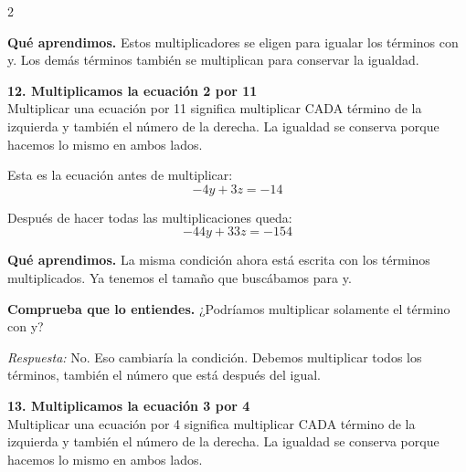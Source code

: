 \documentclass[11pt,a4paper,landscape]{article}
\begin{document}
\begin{multicols*}{2}
\begin{minipage}{\linewidth}
\par\smallskip\textbf{Qué aprendimos.} Estos multiplicadores se eligen para igualar los términos con y. Los demás términos también se multiplican para conservar la igualdad.
\end{minipage}\par\medskip
\noindent\begin{minipage}{\linewidth}\textbf{12. Multiplicamos la ecuación 2 por 11}\\[2pt]Multiplicar una ecuación por 11 significa multiplicar CADA término de la izquierda y también el número de la derecha. La igualdad se conserva porque hacemos lo mismo en ambos lados.
\par\smallskip Esta es la ecuación antes de multiplicar:
\[-4y + 3z = -14\]
\par{}\par\smallskip
\par\smallskip Después de hacer todas las multiplicaciones queda:
\[-44y + 33z = -154\]
\par\smallskip\textbf{Qué aprendimos.} La misma condición ahora está escrita con los términos multiplicados. Ya tenemos el tamaño que buscábamos para y.
\par\smallskip\textbf{Comprueba que lo entiendes.} ¿Podríamos multiplicar solamente el término con y?\par\textit{Respuesta:} No. Eso cambiaría la condición. Debemos multiplicar todos los términos, también el número que está después del igual.
\end{minipage}\par\medskip
\noindent\begin{minipage}{\linewidth}\textbf{13. Multiplicamos la ecuación 3 por 4}\\[2pt]Multiplicar una ecuación por 4 significa multiplicar CADA término de la izquierda y también el número de la derecha. La igualdad se conserva porque hacemos lo mismo en ambos lados.

\end{minipage}
\end{multicols*}
\end{document}
